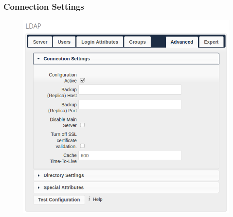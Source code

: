 \documentclass[letterpaper,10pt,english]{sphinxmanual}
\begin{document}
\subsubsection{Connection Settings}
\label{configuration_user/user_auth_ldap:connection-settings}\begin{figure}[htbp]
\centering

\includegraphics{ldap-advanced-1-connection.png}
\end{figure}
\end{document}
